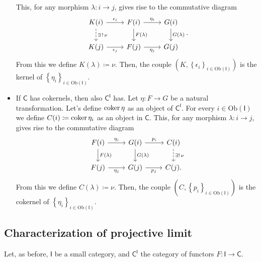 \begin{prop}
\begin{itemize}
			This, for any morphism $\lambda\colon i \to j$, gives rise to the commutative diagram
			\begin{equation}
			\begin{tikzcd}
				K(i) \arrow[d, "\exists\, !\, \nu", dashrightarrow] \arrow[r, "\epsilon_i", rightarrow] &
				F(i) \arrow[r, "\eta_i", rightarrow] \arrow[d, "F(\lambda)", rightarrow] &
				G(i) \arrow[d, "G(\lambda)", rightarrow] \\
				K(j) \arrow[r, "\epsilon_j"', rightarrow] &
				F(j) \arrow[r, "\eta_j"', rightarrow] &
				G(j)
			\end{tikzcd}
			.\end{equation} 
			From this we define $K(\lambda) \coloneqq \nu$.
			Then, the couple $\left(K, \left\{ \epsilon_i \right\}_{i \in \mathrm{Ob} \left(\mathsf{I}\right)} \right)$
			is the kernel of $\left\{ \eta_i \right\}_{i \in \mathrm{Ob} \left(\mathsf{I}\right)}$.

		\item If $\mathsf{C}$ has cokernels, 
			then also $\mathsf{C}^{\mathsf{I}}$ has.
			Let $\eta\colon F \to G$ be a natural transformation.
			Let's define $\operatorname{coker} \eta$ as an object of $\mathsf{C}^{\mathsf{I}}$.
			For every $i \in \mathrm{Ob} \left(\mathsf{I}\right)$
			we define $C(i) \coloneqq \operatorname{coker} \eta_i$ as an object in $\mathsf{C}$.
			This, for any morphism $\lambda\colon i \to j$, gives rise to the commutative diagram
			\begin{equation}
			\begin{tikzcd}
				F(i) \arrow[r, "\eta_i", rightarrow] \arrow[d, "F(\lambda)", rightarrow] &
				G(i) \arrow[d, "G(\lambda)", rightarrow] 
				\arrow[r, "p_i", rightarrow] &
				C(i) \arrow[d, "\exists !\, \nu", dashrightarrow] \\
				F(j) \arrow[r, "\eta_j"', rightarrow] &
				G(j) \arrow[r, "p_j"', rightarrow] &
				C(j).
			\end{tikzcd}
			\end{equation} 
			From this we define $C(\lambda) \coloneqq \nu$.
			Then, the couple
			$\left(C, \left\{ p_i \right\}_{i \in \mathrm{Ob} \left(\mathsf{I}\right)} \right)$
			is the cokernel of 
			$\left\{ \eta_i \right\}_{i \in \mathrm{Ob} \left(\mathsf{I}\right)}$.
	\end{itemize}
\end{prop} 

\subsection{Characterization of projective limit}
Let, as before, $\mathsf{I}$ be a small category, and $\mathsf{C}^{\mathsf{I}}$ the category of functors $F\colon \mathsf{I} \to \mathsf{C}$.

